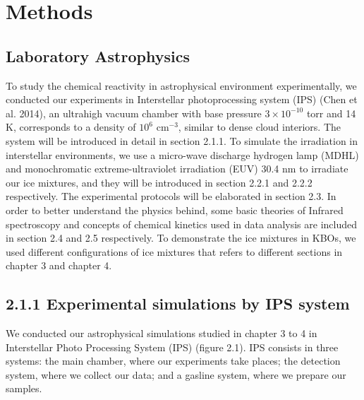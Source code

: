 \chapter{\protect Methods}

\section{Laboratory Astrophysics}
To study the chemical reactivity in astrophysical environment experimentally,
we conducted our experiments in Interstellar photoprocessing system (IPS) (Chen et al. 2014),
an ultrahigh vacuum chamber with base pressure $3 \times 10^{-10}$ torr and 14 K,
corresponds to a density of $10^6$ cm$^{-3}$, similar to dense cloud interiors.
The system will be introduced in detail in section 2.1.1.
To simulate the irradiation in interstellar environments,
we use a micro-wave discharge hydrogen lamp (MDHL) and monochromatic extreme-ultraviolet irradiation (EUV) 30.4 nm to irradiate our ice mixtures,
and they will be introduced in section 2.2.1 and 2.2.2 respectively.
The experimental protocols will be elaborated in section 2.3.
In order to better understand the physics behind, some basic theories of Infrared spectroscopy and concepts of chemical kinetics used in data analysis are included in section 2.4 and 2.5 respectively.
To demonstrate the ice mixtures in KBOs, we used different configurations of ice mixtures that refers to different sections in chapter 3 and chapter 4.\\

\section{2.1.1 Experimental simulations by IPS system}

We conducted our astrophysical simulations studied in chapter 3 to 4 in Interstellar Photo Processing System (IPS) (figure 2.1). IPS consists in three systems: the main chamber, where our experiments take places; the detection system, where we collect our data; and a gasline system, where we prepare our samples.

